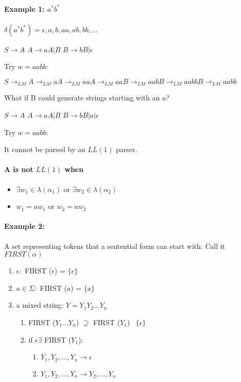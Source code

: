 \documentclass[twocolumn]{article}
\begin{document}
\paragraph*{Example 1: $a^* b^*$}


$\delta(a^* b^*) = {\mathcal{\epsilon}, a, b, aa, ab, bb, \dots}$

$S \to A$
\hfill
$A \to aA | B$
\hfill
$B \to bB | \mathcal{\epsilon}$

Try $w = aabb$:

$S \to_{LM} A \to_{LM} aA \to_{LM} aaA \to_{LM} aaB \to_{LM} aabB \to_{LM} aabbB \to_{LM} aabb$

What if B could generate strings starting with an $a$?

$S \to A$
\hfill
$A \to aA | B$
\hfill
$B \to bB | a | \mathcal{\epsilon}$

Try $w = aabb$:

It cannot be parsed by an $LL(1)$ parser.

\pagebreak

\paragraph*{A is not $LL(1)$ when}
\begin{itemize}
  \item $\exists w_1 \in \lambda (\alpha _1)$ or $\exists w_2 \in \lambda (\alpha _2)$
  \item $w_1 = aw_1$ or $w_2 = aw_2$
\end{itemize}

\paragraph*{Example 2:}
A set representing tokens that a sentential form can start with: Call it $FIRST(\alpha)$

\begin{enumerate}
  \item $\mathcal{\epsilon}: $ FIRST ($\mathcal{\epsilon}$) = $\{\mathcal{\epsilon}\}$
  \item $a\in \Sigma: $ FIRST ($a$) = $\{a\}$
  \item a mixed string: $Y = Y_1 Y_2 \dots Y_n$
        \begin{enumerate}
          \item FIRST ($Y_1 \dots Y_n$) $\supseteq$ FIRST ($Y_1$) \ $\{\mathcal{\epsilon}\}$
          \item if $\mathcal{\epsilon} \exists$ FIRST ($Y_1$):
                \begin{enumerate}
                  \item $Y_1, Y_2, \dots, Y_n \to \mathcal{\epsilon}$
                  \item $Y_1, Y_2, \dots, Y_n \to Y_2, \dots, Y_n$
                \end{enumerate}
        \end{enumerate}
\end{enumerate}
\end{document}
